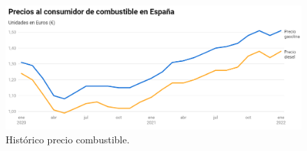 \begin{figure}[H]
    \centering
    \includegraphics[scale=0.35]{archivos/precio gasolina 2021.png}
    \caption{Histórico precio combustible.}
    \label{fig:precio gasolina 2021}
\end{figure}

